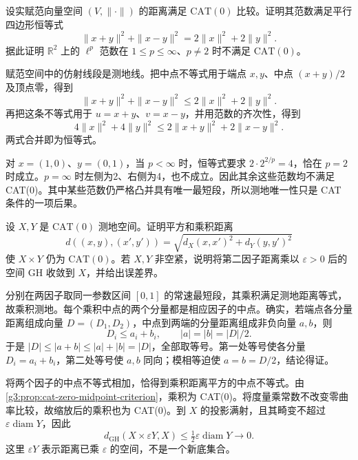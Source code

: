 \begin{optionalexercise}\label{g3:ex:cat-norm-parallelogram}
	设实赋范向量空间 \((V,\|\cdot\|)\) 的距离满足 \(\mathrm{CAT}(0)\) 比较。证明其范数满足平行四边形恒等式
	\[
		\|x+y\|^2+\|x-y\|^2=2\|x\|^2+2\|y\|^2.
	\]
	据此证明 \(\mathbb R^2\) 上的 \(\ell^p\) 范数在 \(1\le p\le\infty\)、\(p\ne2\) 时不满足 \(\mathrm{CAT}(0)\)。
\end{optionalexercise}
\begin{solution}
	赋范空间中的仿射线段是测地线。把中点不等式用于端点 \(x,y\)、中点 \((x+y)/2\) 及顶点零，得到
	\[
		\|x+y\|^2+\|x-y\|^2\le2\|x\|^2+2\|y\|^2.
	\]
	再把这条不等式用于 \(u=x+y\)、\(v=x-y\)，并用范数的齐次性，得到
	\[
		4\|x\|^2+4\|y\|^2\le2\|x+y\|^2+2\|x-y\|^2.
	\]
	两式合并即为恒等式。

	对 \(x=(1,0)\)、\(y=(0,1)\)，当 \(p<\infty\) 时，恒等式要求 \(2\cdot2^{2/p}=4\)，恰在 \(p=2\) 时成立。\(p=\infty\) 时左侧为2、右侧为4，也不成立。因此其余这些范数均不满足 CAT(0)。其中某些范数仍严格凸并具有唯一最短段，所以测地唯一性只是 CAT 条件的一项后果。
\end{solution}

\begin{optionalexercise}\label{g3:ex:cat-product-collapse}
	设 \(X,Y\) 是 \(\mathrm{CAT}(0)\) 测地空间。证明平方和乘积距离
	\[
		d((x,y),(x',y'))=\sqrt{d_X(x,x')^2+d_Y(y,y')^2}
	\]
	使 \(X\times Y\) 仍为 \(\mathrm{CAT}(0)\)。若 \(X,Y\) 非空紧，说明将第二因子距离乘以 \(\varepsilon>0\) 后的空间 GH 收敛到 \(X\)，并给出误差界。
\end{optionalexercise}
\begin{solution}
	分别在两因子取同一参数区间 \([0,1]\) 的常速最短段，其乘积满足测地距离等式，故乘积测地。每个乘积中点的两个分量都是相应因子的中点。确实，若端点各分量距离组成向量 \(D=(D_1,D_2)\)，中点到两端的分量距离组成非负向量 \(a,b\)，则
	\[
		D_i\le a_i+b_i,\qquad |a|=|b|=|D|/2.
	\]
	于是 \(|D|\le|a+b|\le|a|+|b|=|D|\)，全部取等号。第一处等号使各分量 \(D_i=a_i+b_i\)，第二处等号使 \(a,b\) 同向；模相等迫使 \(a=b=D/2\)，结论得证。

	将两个因子的中点不等式相加，恰得到乘积距离平方的中点不等式。由\cref{g3:prop:cat-zero-midpoint-criterion}，乘积为 CAT(0)。将度量乘常数不改变零曲率比较，故缩放后的乘积也为 CAT(0)。到 \(X\) 的投影满射，且其畸变不超过 \(\varepsilon\operatorname{diam}Y\)，因此
	\[
		d_{\mathrm{GH}}(X\times\varepsilon Y,X)
		\le\tfrac12\varepsilon\operatorname{diam}Y\longrightarrow0.
	\]
	这里 \(\varepsilon Y\) 表示距离已乘 \(\varepsilon\) 的空间，不是一个新底集合。
\end{solution}

